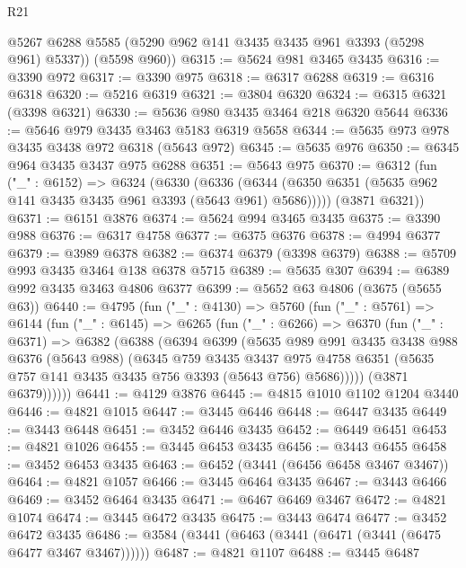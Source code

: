 \begin{lexlean}{R21}
\begin{coremodule}
        @5267
        @6288
        @5585
        (@5290 @962 @141 @3435 @3435 @961 @3393 (@5298 @961) @5337))
      (@5598 @960))
@6315 := @5624 @981 @3465 @3435
@6316 := @3390 @972
@6317 := @3390 @975
@6318 := @6317 @6288
@6319 := @6316 @6318
@6320 := @5216 @6319
@6321 := @3804 @6320
@6324 := @6315 @6321 (@3398 @6321)
@6330 := @5636 @980 @3435 @3464 @218 @6320 @5644
@6336 := @5646 @979 @3435 @3463 @5183 @6319 @5658
@6344 := @5635 @973 @978 @3435 @3438 @972 @6318 (@5643 @972)
@6345 := @5635 @976
@6350 := @6345 @964 @3435 @3437 @975 @6288
@6351 := @5643 @975
@6370 := @6312
    (fun ("_" : @6152) =>
    @6324
      (@6330
        (@6336 (@6344 (@6350 @6351 (@5635 @962 @141 @3435 @3435 @961 @3393 (@5643 @961) @5686)))))
      (@3871 @6321))
@6371 := @6151 @3876
@6374 := @5624 @994 @3465 @3435
@6375 := @3390 @988
@6376 := @6317 @4758
@6377 := @6375 @6376
@6378 := @4994 @6377
@6379 := @3989 @6378
@6382 := @6374 @6379 (@3398 @6379)
@6388 := @5709 @993 @3435 @3464 @138 @6378 @5715
@6389 := @5635 @307
@6394 := @6389 @992 @3435 @3463 @4806 @6377
@6399 := @5652 @63 @4806 (@3675 (@5655 @63))
@6440 := @4795
    (fun ("_" : @4130) =>
    @5760
      (fun ("_" : @5761) =>
      @6144
        (fun ("_" : @6145) =>
        @6265
          (fun ("_" : @6266) =>
          @6370
            (fun ("_" : @6371) =>
            @6382
              (@6388
                (@6394
                  @6399
                  (@5635
                    @989
                    @991
                    @3435
                    @3438
                    @988
                    @6376
                    (@5643 @988)
                    (@6345
                      @759
                      @3435
                      @3437
                      @975
                      @4758
                      @6351
                      (@5635 @757 @141 @3435 @3435 @756 @3393 (@5643 @756) @5686)))))
              (@3871 @6379))))))
@6441 := @4129 @3876
@6445 := @4815 @1010 @1102 @1204 @3440
@6446 := @4821 @1015
@6447 := @3445 @6446
@6448 := @6447 @3435
@6449 := @3443 @6448
@6451 := @3452 @6446 @3435
@6452 := @6449 @6451
@6453 := @4821 @1026
@6455 := @3445 @6453 @3435
@6456 := @3443 @6455
@6458 := @3452 @6453 @3435
@6463 := @6452 (@3441 (@6456 @6458 @3467 @3467))
@6464 := @4821 @1057
@6466 := @3445 @6464 @3435
@6467 := @3443 @6466
@6469 := @3452 @6464 @3435
@6471 := @6467 @6469 @3467
@6472 := @4821 @1074
@6474 := @3445 @6472 @3435
@6475 := @3443 @6474
@6477 := @3452 @6472 @3435
@6486 := @3584 (@3441 (@6463 (@3441 (@6471 (@3441 (@6475 @6477 @3467 @3467))))))
@6487 := @4821 @1107
@6488 := @3445 @6487

\end{coremodule}
\end{lexlean}
